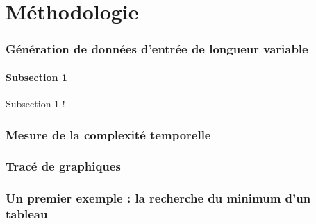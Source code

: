 \part{Méthodologie}

  \section{Génération de données d'entrée de longueur variable}

    \subsection{Subsection 1}

    Subsection 1 !

  \section{Mesure de la complexité temporelle}

  \section{Tracé de graphiques}
  \section{Un premier exemple : la recherche du minimum d'un tableau}
